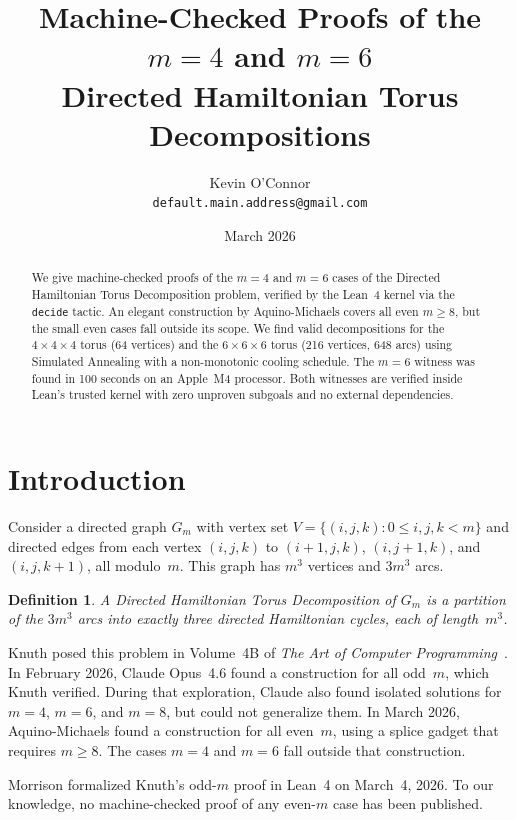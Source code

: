 \documentclass[11pt]{article}
\title{Machine-Checked Proofs of the $m=4$ and $m=6$ \\
Directed Hamiltonian Torus Decompositions}
\author{
  Kevin O'Connor\\
  \texttt{default.main.address@gmail.com}
}
\date{March 2026}
\theoremstyle{plain}
\newtheorem{definition}{Definition}
\begin{document}
\maketitle

\begin{abstract}
We give machine-checked proofs of the $m=4$ and $m=6$ cases of the Directed
Hamiltonian Torus Decomposition problem, verified by the Lean~4 kernel via
the \texttt{decide} tactic. An elegant construction by Aquino-Michaels
covers all even $m \ge 8$, but the small even cases fall outside its scope.
We find valid decompositions for the $4 \times 4 \times 4$ torus
(64 vertices) and the $6 \times 6 \times 6$ torus (216 vertices, 648 arcs)
using Simulated Annealing with a non-monotonic cooling schedule. The $m=6$
witness was found in 100 seconds on an Apple~M4 processor. Both witnesses
are verified inside Lean's trusted kernel with zero unproven subgoals and
no external dependencies.
\end{abstract}

\section{Introduction}

Consider a directed graph $G_m$ with vertex set
$V = \{(i, j, k) : 0 \le i, j, k < m\}$ and directed edges from each vertex
$(i,j,k)$ to $(i{+}1, j, k)$, $(i, j{+}1, k)$, and $(i, j, k{+}1)$, all
modulo~$m$. This graph has $m^3$ vertices and $3m^3$ arcs.

\begin{definition}
A \emph{Directed Hamiltonian Torus Decomposition} of $G_m$ is a partition of
the $3m^3$ arcs into exactly three directed Hamiltonian cycles, each of
length~$m^3$.
\end{definition}

Knuth posed this problem in Volume~4B of \emph{The Art of Computer
Programming}~\cite{knuth2026}. In February 2026, Claude Opus~4.6 found a
construction for all odd~$m$, which Knuth verified. During that exploration,
Claude also found isolated solutions for $m = 4$, $m = 6$, and $m = 8$, but
could not generalize them. In March 2026, Aquino-Michaels found a
construction for all even~$m$, using a splice gadget that requires $m \ge 8$.
The cases $m = 4$ and $m = 6$ fall outside that construction.

Morrison formalized Knuth's odd-$m$ proof in Lean~4 on March~4, 2026.
To our knowledge, no machine-checked proof of any even-$m$ case has been
published.
\end{document}
